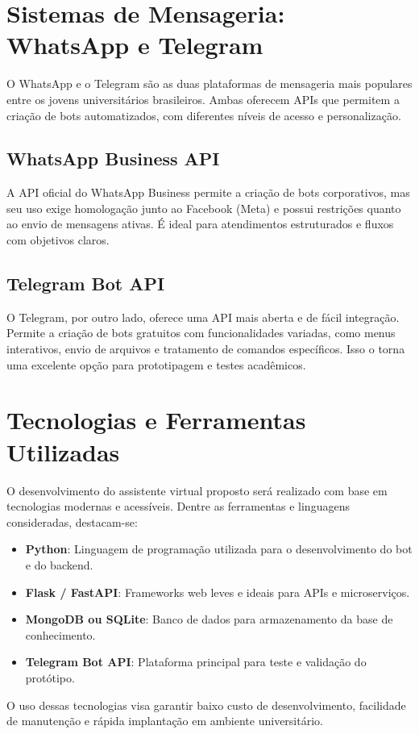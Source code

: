 \section{Sistemas de Mensageria: WhatsApp e Telegram}

O WhatsApp e o Telegram são as duas plataformas de mensageria mais populares entre os jovens universitários brasileiros. Ambas oferecem APIs que permitem a criação de bots automatizados, com diferentes níveis de acesso e personalização.

\subsection{WhatsApp Business API}

A API oficial do WhatsApp Business permite a criação de bots corporativos, mas seu uso exige homologação junto ao Facebook (Meta) e possui restrições quanto ao envio de mensagens ativas. É ideal para atendimentos estruturados e fluxos com objetivos claros.

\subsection{Telegram Bot API}

O Telegram, por outro lado, oferece uma API mais aberta e de fácil integração. Permite a criação de bots gratuitos com funcionalidades variadas, como menus interativos, envio de arquivos e tratamento de comandos específicos. Isso o torna uma excelente opção para prototipagem e testes acadêmicos.

\section{Tecnologias e Ferramentas Utilizadas}

O desenvolvimento do assistente virtual proposto será realizado com base em tecnologias modernas e acessíveis. Dentre as ferramentas e linguagens consideradas, destacam-se:

\begin{itemize}
    \item \textbf{Python}: Linguagem de programação utilizada para o desenvolvimento do bot e do backend.
    \item \textbf{Flask / FastAPI}: Frameworks web leves e ideais para APIs e microserviços.
    \item \textbf{MongoDB ou SQLite}: Banco de dados para armazenamento da base de conhecimento.
    \item \textbf{Telegram Bot API}: Plataforma principal para teste e validação do protótipo.
\end{itemize}

O uso dessas tecnologias visa garantir baixo custo de desenvolvimento, facilidade de manutenção e rápida implantação em ambiente universitário.
